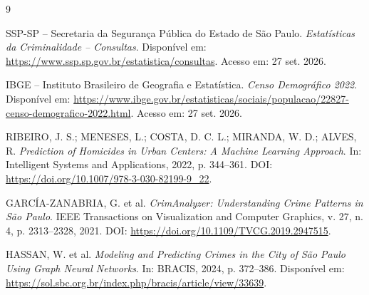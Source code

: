 \documentclass[12pt]{article}
\begin{document}
\renewcommand{\refname}{Referências}
\begin{thebibliography}{9}

 SSP-SP -- Secretaria da Segurança Pública do Estado de São Paulo. \textit{Estatísticas da Criminalidade -- Consultas}. Disponível em: \url{https://www.ssp.sp.gov.br/estatistica/consultas}. Acesso em: 27 set. 2026.

 IBGE -- Instituto Brasileiro de Geografia e Estatística. \textit{Censo Demográfico 2022}. Disponível em: \url{https://www.ibge.gov.br/estatisticas/sociais/populacao/22827-censo-demografico-2022.html}. Acesso em: 27 set. 2026.

 RIBEIRO, J. S.; MENESES, L.; COSTA, D. C. L.; MIRANDA, W. D.; ALVES, R. \textit{Prediction of Homicides in Urban Centers: A Machine Learning Approach}. In: Intelligent Systems and Applications, 2022, p. 344--361. DOI: \url{https://doi.org/10.1007/978-3-030-82199-9_22}.

 GARCÍA-ZANABRIA, G. et al. \textit{CrimAnalyzer: Understanding Crime Patterns in São Paulo}. IEEE Transactions on Visualization and Computer Graphics, v. 27, n. 4, p. 2313--2328, 2021. DOI: \url{https://doi.org/10.1109/TVCG.2019.2947515}.

 HASSAN, W. et al. \textit{Modeling and Predicting Crimes in the City of São Paulo Using Graph Neural Networks}. In: BRACIS, 2024, p. 372--386. Disponível em: \url{https://sol.sbc.org.br/index.php/bracis/article/view/33639}.

\end{thebibliography}
\end{document}
